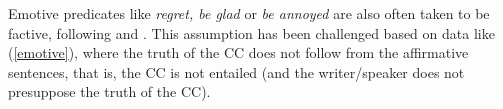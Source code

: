 \documentclass[11pt,fleqn]{article}
\def\infelic{{\leavevmode\llap{\#}}}
\newcommand{\6}{\mbox{$[\hspace*{-.6mm}[$}}
\newcommand{\9}{\mbox{$]\hspace*{-.6mm}]$}}
\begin{document}
%
%
%
%
%
%

%
%
%
%
%





%

Emotive predicates like {\em regret, be glad} or {\em be annoyed} are also often taken to be factive, following \citealt{kiparsky-kiparsky70} and \citealt{karttunen71b}. This assumption has been challenged based on data like (\ref{emotive}), where the truth of the CC does not follow from the affirmative sentences, that is, the CC is not entailed (and the writer/speaker does not presuppose the truth of the CC).
\end{document}
